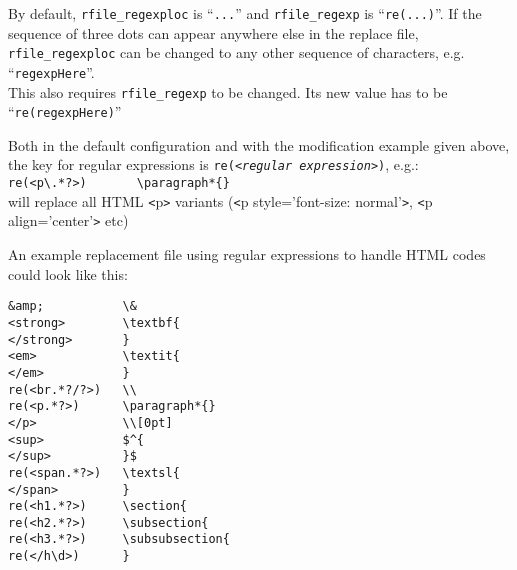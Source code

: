 \documentclass{article}
\newcommand{\vs}{\vspace{3mm}}
\begin{document}
\vs

By default, \texttt{rfile\_regexploc} is ``\texttt{...}'' and \texttt{rfile\_regexp} is ``\texttt{re(...)}''. If the sequence of three dots can appear anywhere else in the replace file, \texttt{rfile\_regexploc} can be changed to any other sequence of characters, e.g. ``\texttt{regexpHere}''.\\
This also requires \texttt{rfile\_regexp} to be changed. Its new value has to be ``\texttt{re(regexpHere)}''
 
\vs

Both in the default configuration and with the modification example given above, the key for regular expressions is \texttt{re(<\textit{regular expression}>)}, e.g.:\\
\hspace{3mm}\verb+re(<p\.*?>)		\paragraph*{}+ \\
will replace all HTML \texttt{<}p\texttt{>} variants (\texttt{<}p style='font-size: normal'\texttt{>}, \texttt{<}p align='center'\texttt{>} etc)

\vs

An example replacement file using regular expressions to handle HTML codes could look like this:

\noindent\begin{verbatim}
&amp;           \&
<strong>        \textbf{
</strong>       }
<em>            \textit{
</em>           }
re(<br.*?/?>)   \\
re(<p.*?>)      \paragraph*{}
</p>            \\[0pt]
<sup>           $^{
</sup>          }$
re(<span.*?>)   \textsl{
</span>         }
re(<h1.*?>)     \section{
re(<h2.*?>)     \subsection{
re(<h3.*?>)     \subsubsection{
re(</h\d>)      }
\end{verbatim}
\end{document}
